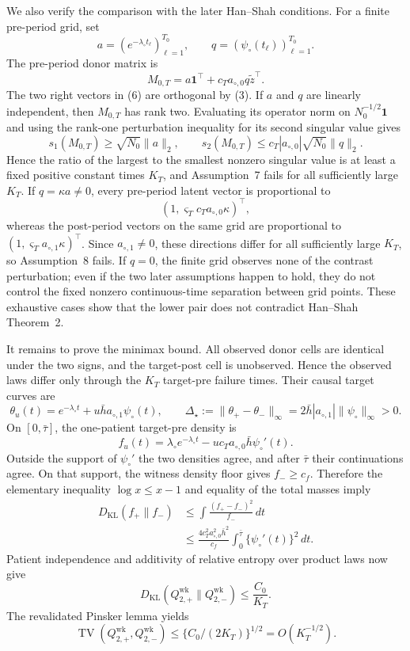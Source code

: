 We also verify the comparison with the later Han--Shah conditions.  For a finite pre-period grid, set
\[
 a=(e^{-\lambda_\circ t_\ell})_{\ell=1}^{T_0},
 \qquad q=(\psi_\circ(t_\ell))_{\ell=1}^{T_0}.
\]
The pre-period donor matrix is
\[
 M_{0,T}=a\mathbf1^\top+c_Ta_{\circ,0}q\widetilde z^\top. \tag{6}
\]
The two right vectors in (6) are orthogonal by (3).  If \(a\) and \(q\) are linearly independent, then \(M_{0,T}\) has rank two.  Evaluating its operator norm on \(N_0^{-1/2}\mathbf1\) and using the rank-one perturbation inequality for its second singular value gives
\[
 s_1(M_{0,T})\ge\sqrt{N_0}\|a\|_2,
 \qquad
 s_2(M_{0,T})\le c_T|a_{\circ,0}|\sqrt{N_0}\|q\|_2.    \tag{7}
\]
Hence the ratio of the largest to the smallest nonzero singular value is at least a fixed positive constant times \(K_T\), and Assumption~7 fails for all sufficiently large \(K_T\).  If \(q=\kappa a\ne0\), every pre-period latent vector is proportional to
\[
 (1,\varsigma_Tc_Ta_{\circ,0}\kappa)^\top,              \tag{8}
\]
whereas the post-period vectors on the same grid are proportional to \((1,\varsigma_Ta_{\circ,1}\kappa)^\top\).  Since \(a_{\circ,1}\ne0\), these directions differ for all sufficiently large \(K_T\), so Assumption~8 fails.  If \(q=0\), the finite grid observes none of the contrast perturbation; even if the two later assumptions happen to hold, they do not control the fixed nonzero continuous-time separation between grid points.  These exhaustive cases show that the lower pair does not contradict Han--Shah Theorem~2.

It remains to prove the minimax bound.  All observed donor cells are identical under the two signs, and the target-post cell is unobserved.  Hence the observed laws differ only through the \(K_T\) target-pre failure times.  Their causal target curves are
\[
 \theta_u(t)=e^{-\lambda_\circ t}+u\bar h a_{\circ,1}\psi_\circ(t),
 \qquad
 \Delta_\star:=\|\theta_+-\theta_-\|_\infty
 =2\bar h|a_{\circ,1}|\|\psi_\circ\|_\infty>0.         \tag{9}
\]
On \([0,\bar\tau]\), the one-patient target-pre density is
\[
 f_u(t)=\lambda_\circ e^{-\lambda_\circ t}
        -u c_Ta_{\circ,0}\bar h\psi_\circ'(t).          \tag{10}
\]
Outside the support of \(\psi_\circ'\) the two densities agree, and after \(\bar\tau\) their continuations agree.  On that support, the witness density floor gives \(f_-\ge c_f\).  Therefore the elementary inequality \(\log x\le x-1\) and equality of the total masses imply
\[
 \begin{aligned}
 D_{\mathrm{KL}}(f_+\|f_-)
 &\le \int\frac{(f_+-f_-)^2}{f_-}\,dt\\
 &\le \frac{4c_T^2a_{\circ,0}^2\bar h^2}{c_f}
       \int_0^{\bar\tau}\{\psi_\circ'(t)\}^2\,dt.
 \end{aligned}                                           \tag{11}
\]
Patient independence and additivity of relative entropy over product laws now give
\[
 D_{\mathrm{KL}}(Q_{2,+}^{\mathrm{wk}}\|Q_{2,-}^{\mathrm{wk}})
 \le \frac{C_0}{K_T}.                                    \tag{12}
\]
The revalidated Pinsker lemma yields
\[
 \operatorname{TV}(Q_{2,+}^{\mathrm{wk}},Q_{2,-}^{\mathrm{wk}})
 \le\{C_0/(2K_T)\}^{1/2}=O(K_T^{-1/2}).                 \tag{13}
\]


